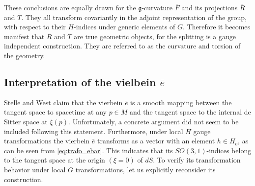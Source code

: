 \documentclass[11pt]{article}
\begin{document}
These conclusions are equally drawn for the 
$\mathfrak{g}$-curvature $\bar{F}$ and its projections $\bar{R}$ 
and $\bar{T}$. They all transform covariantly in the adjoint 
representation of the group, with respect to their $H$-indices 
under generic elements of $G$. Therefore it becomes manifest that 
$\bar{R}$ and $\bar{T}$ are true geometric objects, for the 
splitting is a gauge independent construction.  They are referred 
to as the curvature and torsion of the geometry.


\subsection{Interpretation of the vielbein $\bar{e}$}

Stelle and West \cite{Stelle:1979va,stelle.west:1980ds} claim 
that the vierbein $\bar{e}$ is a smooth mapping between the 
tangent space to spacetime at any $p \in M$  and the tangent 
space to the internal de Sitter space at $\xi(p)$. Unfortunately, 
a concrete argument did not seem to be included following this 
statement.  Furthermore, under local $H$ gauge transformations 
the vierbein $\bar{e}$ transforms as a vector with an element $h 
\in H_o$, as can be seen from \eqref{eq:trafo_ebar}.  This 
indicates that its $SO(3,1)$-indices belong to the tangent space 
at the origin $(\xi = 0)$ of $dS$. To verify its transformation 
behavior under local $G$ transformations, let us explicitly 
reconsider its construction.  
\end{document}
